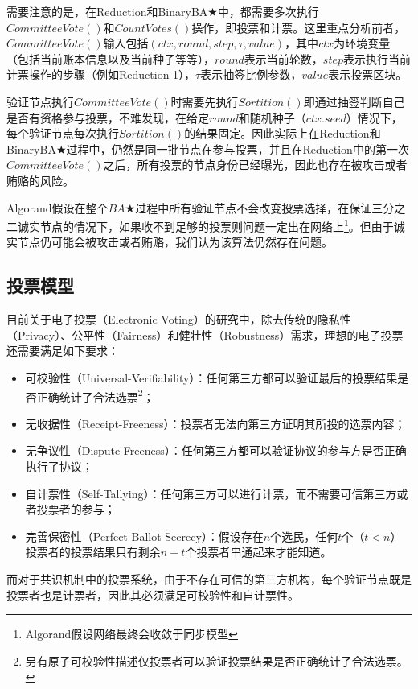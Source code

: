 需要注意的是，在Reduction和BinaryBA$\bigstar$中，都需要多次执行$CommitteeVote()$和$CountVotes()$操作，即投票和计票。这里重点分析前者，$CommitteeVote()$输入包括$(ctx,round,step,\tau,value)$，其中$ctx$为环境变量（包括当前账本信息以及当前种子等等），$round$表示当前轮数，$step$表示执行当前计票操作的步骤（例如Reduction-1），$\tau$表示抽签比例参数，$value$表示投票区块。

验证节点执行$CommitteeVote()$时需要先执行$Sortition()$即通过抽签判断自己是否有资格参与投票，不难发现，在给定$round$和随机种子（$ctx.seed$）情况下，每个验证节点每次执行$Sortition()$的结果固定。因此实际上在Reduction和BinaryBA$\bigstar$过程中，仍然是同一批节点在参与投票，并且在Reduction中的第一次$CommitteeVote()$之后，所有投票的节点身份已经曝光，因此也存在被攻击或者贿赂的风险。

Algorand假设在整个$BA\bigstar$过程中所有验证节点不会改变投票选择，在保证三分之二诚实节点的情况下，如果收不到足够的投票则问题一定出在网络上\footnote{Algorand假设网络最终会收敛于同步模型}。但由于诚实节点仍可能会被攻击或者贿赂，我们认为该算法仍然存在问题。


\subsection{投票模型}
目前关于电子投票（Electronic Voting）的研究中\cite{kiayias2002self}，除去传统的隐私性（Privacy）、公平性（Fairness）和健壮性（Robustness）需求，理想的电子投票还需要满足如下要求：
\begin{itemize}
	\item 可校验性（Universal-Verifiability）：任何第三方都可以验证最后的投票结果是否正确统计了合法选票\footnote{另有原子可校验性描述仅投票者可以验证投票结果是否正确统计了合法选票。}；
	\item 无收据性（Receipt-Freeness）：投票者无法向第三方证明其所投的选票内容；
	\item 无争议性（Dispute-Freeness）：任何第三方都可以验证协议的参与方是否正确执行了协议；
	\item 自计票性（Self-Tallying）：任何第三方可以进行计票，而不需要可信第三方或者投票者的参与；
	\item 完善保密性（Perfect Ballot Secrecy）：假设存在$n$个选民，任何$t$个（$t<n$）投票者的投票结果只有剩余$n-t$个投票者串通起来才能知道。
\end{itemize}

而对于共识机制中的投票系统，由于不存在可信的第三方机构，每个验证节点既是投票者也是计票者，因此其必须满足可校验性和自计票性。

